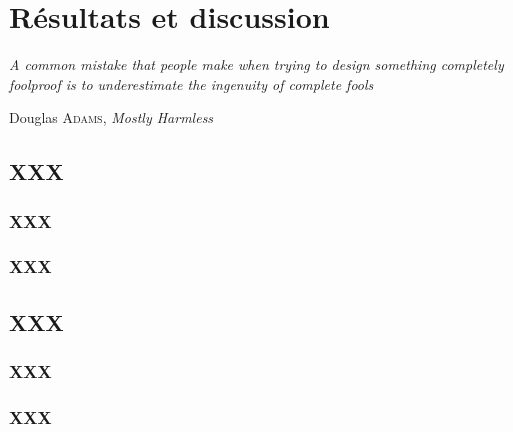 \documentclass[../main/main.tex]{subfiles}
\begin{document}

\chapter{Résultats et discussion}\label{ch:res}
\epigraph{\openquote\textit{A common mistake that people make when trying to
design something completely foolproof is to underestimate the ingenuity of
complete fools}\closequote}{Douglas \textsc{Adams}, \textit{Mostly Harmless}}

\vfill
\minitoc
\vfill

\newpage

\section{XXX}

\subsection{XXX}

\subsection{XXX}


\section{XXX}

\subsection{XXX}

\subsection{XXX}

\clearpage

\thispagestyle{plain}
\vfill
\minilof
\vfill
\minilot
\vfill

% 
% 
\end{document}
